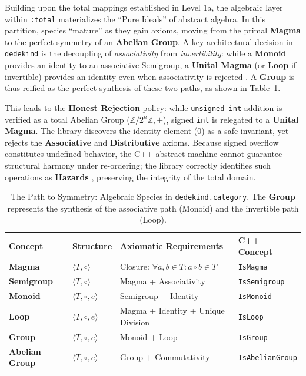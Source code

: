 \documentclass[11pt, a4paper]{report}
\begin{document}
Building upon the total mappings established in Level 1a, the algebraic layer within \texttt{:total} materializes the ``Pure Ideals'' of abstract algebra.
In this partition, species ``mature'' as they gain axioms, moving from the primal \textbf{Magma} to the perfect symmetry of an \textbf{Abelian Group}.
A key architectural decision in \texttt{dedekind} is the decoupling of \emph{associativity} from \emph{invertibility}: while a \textbf{Monoid} provides an identity to an associative Semigroup, a \textbf{Unital Magma} (or \textbf{Loop} if invertible) provides an identity even when associativity is rejected \cite{bruck1971survey}.
A \textbf{Group} is thus reified as the perfect synthesis of these two paths, as shown in Table~\ref{tab:algebraic_hierarchy}.

This leads to the \textbf{Honest Rejection} policy: while \texttt{unsigned int} addition is verified as a total Abelian Group ($\mathbb{Z}/2^n\mathbb{Z}, +$), signed \texttt{int} is relegated to a \textbf{Unital Magma}. 
The library discovers the identity element ($0$) as a safe invariant, yet rejects the \textbf{Associative} and \textbf{Distributive} axioms. 
Because signed overflow constitutes undefined behavior, the C++ abstract machine cannot guarantee structural harmony under re-ordering; the library correctly identifies such operations as \textbf{Hazards} \cite{pomerance2001smooth}, preserving the integrity of the total domain.


\begin{table}[htbp]
\centering
\caption{The Path to Symmetry: Algebraic Species in \texttt{dedekind.category}. The \textbf{Group} represents the synthesis of the associative path (Monoid) and the invertible path (Loop).}
\label{tab:algebraic_hierarchy}
\begin{tabular}{llll}
\hline
\textbf{Concept} & \textbf{Structure} & \textbf{Axiomatic Requirements} & \textbf{C++ Concept} \\ \hline
\textbf{Magma} & $\langle T, \circ \rangle$ & Closure: $\forall a, b \in T : a \circ b \in T$ & \texttt{IsMagma} \\
\textbf{Semigroup} & $\langle T, \circ \rangle$ & Magma + Associativity & \texttt{IsSemigroup} \\
\textbf{Monoid} & $\langle T, \circ, e \rangle$ & Semigroup + Identity & \texttt{IsMonoid} \\
\textbf{Loop} & $\langle T, \circ, e \rangle$ & Magma + Identity + Unique Division & \texttt{IsLoop} \\
\textbf{Group} & $\langle T, \circ, e \rangle$ & Monoid + Loop & \texttt{IsGroup} \\
\textbf{Abelian Group} & $\langle T, \circ, e \rangle$ & Group + Commutativity & \texttt{IsAbelianGroup} \\ \hline
\end{tabular}
\end{table}
\end{document}
